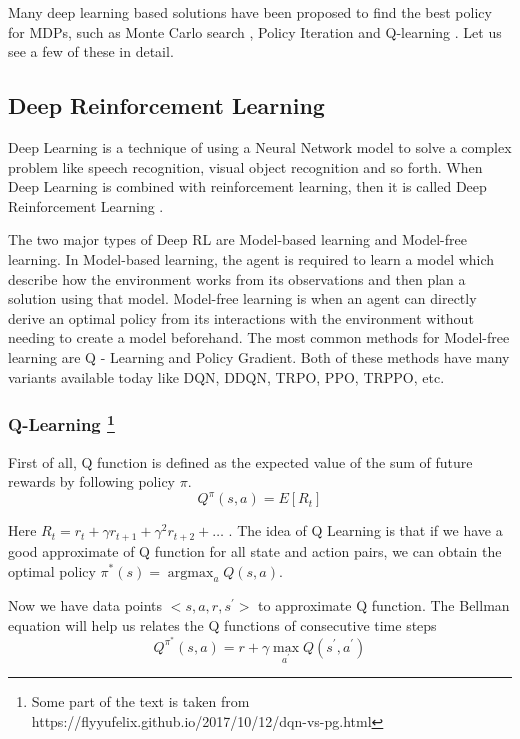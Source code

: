 \documentclass[10pt,twocolumn,letterpaper]{article}
\begin{document}
Many deep learning based solutions have been proposed to find the best policy for MDPs, such as Monte Carlo search \cite{browne_survey_2012},  Policy Iteration \cite{thomas_bias_2014} and Q-learning \cite{watkins_q-learning_1992}. Let us see a few of these in detail.

\subsection{Deep Reinforcement Learning}
\label{deepRL}

Deep Learning \cite{lecun_deep_2015} is a technique of using a Neural Network model to solve a complex problem like speech recognition, visual object recognition and so forth. When Deep Learning is combined with reinforcement learning, then it is called Deep Reinforcement Learning \cite{francois-lavet_introduction_2018}.

The two major types of Deep RL are Model-based learning and Model-free learning. In Model-based learning, the agent is required to learn a model which describe how the environment works from its observations and then plan a solution using that model. Model-free learning is when an agent can directly derive an optimal policy from its interactions with the environment without needing to create a model beforehand. The most common methods for Model-free learning are Q - Learning and Policy Gradient. Both of these methods have many variants available today like DQN, DDQN, TRPO, PPO, TRPPO, etc.

\subsubsection{Q-Learning \footnote{ Some part of the text is taken from https://flyyufelix.github.io/2017/10/12/dqn-vs-pg.html}} 


First of all, Q function is defined as the expected value of the sum of future rewards by following policy $ \pi $.
\begin{equation} 
\label{eq:q_function}
Q^{\pi}(s, a)=E\left[R_{t}\right]
\end{equation}

Here $R_{t}=r_{t}+\gamma r_{t+1}+\gamma^{2} r_{t+2}+\ldots$ .
The idea of Q Learning is that if we have a good approximate of Q function for all state and action pairs, we can obtain the optimal policy $\pi^{*}(s)=\operatorname{argmax}_{a} Q(s, a)$. 

Now we have data points $<s,a,r,s^{\prime} > $ to approximate Q function. The Bellman equation will help us relates the Q functions of consecutive time steps
\begin{equation} 
\label{eq:bellman}
Q^{{\pi}^*} ( s , a ) = r + \gamma \max _ { a ^ { \prime } } Q \left( s ^ { \prime } , a ^ { \prime } \right)
\end{equation}
\end{document}
